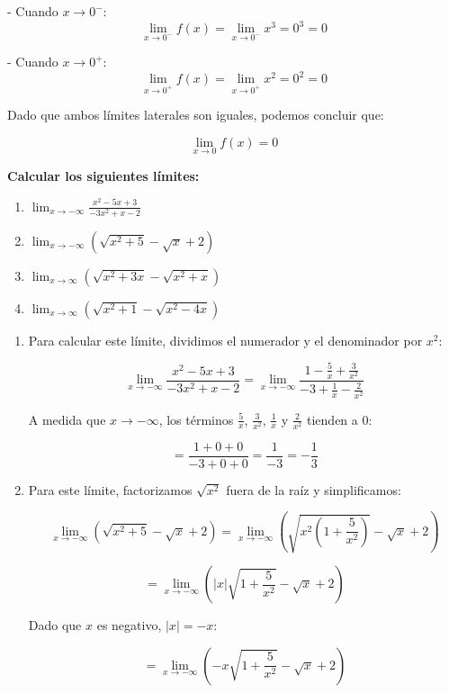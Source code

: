 \documentclass[answers]{exam} %
\begin{document}
\begin{questions}
\begin{solution}
		- Cuando \( x \to 0^- \):
		\[
			\lim_{x \to 0^-} f(x) = \lim_{x \to 0^-} x^3 = 0^3 = 0
		\]

		- Cuando \( x \to 0^+ \):
		\[
			\lim_{x \to 0^+} f(x) = \lim_{x \to 0^+} x^2 = 0^2 = 0
		\]

		Dado que ambos límites laterales son iguales, podemos concluir que:

		\[
			\lim_{x \to 0} f(x) = 0
		\]
	\end{solution}


	\vspace{0.5cm}

	\question \large\textbf{Calcular los siguientes límites:}
	\begin{enumerate}[label=\alph*.]
		\item $\displaystyle \lim_{x\to{-\infty}} \frac{x^2-5x+3}{-3x^2+x-2}$
		\item $\displaystyle \lim_{x\to{-\infty}} (\sqrt{x^2+5}-\sqrt{x}+2)$
		\item $\displaystyle \lim_{x\to{\infty}} (\sqrt{x^2+3x}-\sqrt{x^2+x})$
		\item $\displaystyle \lim_{x\to{\infty}} (\sqrt{x^2+1}-\sqrt{x^2-4x})$
	\end{enumerate}
	\begin{solution}
		\begin{enumerate}[label=\alph*.]
			\item Para calcular este límite, dividimos el numerador y el denominador por \(x^2\):
	
			\[
			\lim_{x\to{-\infty}} \frac{x^2-5x+3}{-3x^2+x-2} = \lim_{x\to{-\infty}} \frac{1-\frac{5}{x}+\frac{3}{x^2}}{-3+\frac{1}{x}-\frac{2}{x^2}}
			\]
	
			A medida que \(x \to -\infty\), los términos \(\frac{5}{x}\), \(\frac{3}{x^2}\), \(\frac{1}{x}\) y \(\frac{2}{x^2}\) tienden a 0:
	
			\[
			= \frac{1+0+0}{-3+0+0} = \frac{1}{-3} = -\frac{1}{3}
			\]
	
			\item Para este límite, factorizamos \(\sqrt{x^2}\) fuera de la raíz y simplificamos:
	
			\[
			\lim_{x\to{-\infty}} (\sqrt{x^2+5}-\sqrt{x}+2) = \lim_{x\to{-\infty}} (\sqrt{x^2(1+\frac{5}{x^2})}-\sqrt{x}+2)
			\]
	
			\[
			= \lim_{x\to{-\infty}} (|x|\sqrt{1+\frac{5}{x^2}}-\sqrt{x}+2)
			\]
	
			Dado que \(x\) es negativo, \(|x| = -x\):
	
			\[
			= \lim_{x\to{-\infty}} (-x\sqrt{1+\frac{5}{x^2}}-\sqrt{x}+2)
			\]
	

\end{enumerate}
\end{solution}
\end{questions}
\end{document}
